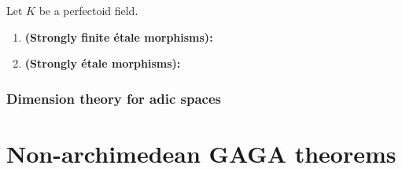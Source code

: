                     \begin{definition} \label{def: strongly_finite_etale_morphisms_of_adic_spaces}
                        Let $K$ be a perfectoid field.
                            \begin{enumerate}
                                \item \textbf{(Strongly finite \'etale morphisms):} 
                                \item \textbf{(Strongly \'etale morphisms):}
                            \end{enumerate}
                    \end{definition}
            
            \subsubsection{Dimension theory for adic spaces}
            
    \section{Non-archimedean GAGA theorems}